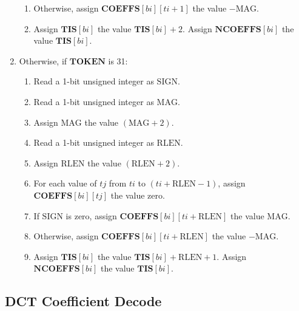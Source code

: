 \documentclass[9pt,letterpaper]{book}
\newcommand{\idx}[1]{{\ensuremath{\mathit{#1}}}}
\newcommand{\bi}{\idx{bi}}
\newcommand{\ti}{\idx{ti}}
\newcommand{\tj}{\idx{tj}}
\newcommand{\bitvar}[1]{\ensuremath{\mathbf{\bm{#1}}}}
\newcommand{\locvar}[1]{\ensuremath{\mathrm{#1}}}
\numberwithin{equation}{chapter}
\numberwithin{figure}{chapter}
\numberwithin{table}{chapter}
\begin{document}
\begin{enumerate}
\begin{enumerate}
\item
Otherwise, assign $\bitvar{COEFFS}[\bitvar{\bi}][\bitvar{\ti}+1]$ the value
 $-\locvar{MAG}$.
\item
Assign $\bitvar{TIS}[\bitvar{\bi}]$ the value $\bitvar{TIS}[\bitvar{\bi}]+2$.
Assign $\bitvar{NCOEFFS}[\bitvar{\bi}]$ the value $\bitvar{TIS}[\bitvar{\bi}]$.
\end{enumerate}
\item
Otherwise, if \bitvar{TOKEN} is 31:
\begin{enumerate}
\item
Read a 1-bit unsigned integer as \locvar{SIGN}.
\item
Read a 1-bit unsigned integer as \locvar{MAG}.
\item
Assign \locvar{MAG} the value $(\locvar{MAG}+2)$.
\item
Read a 1-bit unsigned integer as \locvar{RLEN}.
\item
Assign \locvar{RLEN} the value $(\locvar{RLEN}+2)$.
\item
For each value of \locvar{\tj} from \bitvar{\ti} to
 $(\bitvar{\ti}+\locvar{RLEN}-1)$, assign
 $\bitvar{COEFFS}[\bitvar{\bi}][\locvar{\tj}]$ the value zero.
\item
If \locvar{SIGN} is zero, assign
 $\bitvar{COEFFS}[\bitvar{\bi}][\bitvar{\ti}+\locvar{RLEN}]$ the value
 $\locvar{MAG}$.
\item
Otherwise, assign $\bitvar{COEFFS}[\bitvar{\bi}][\bitvar{\ti}+\locvar{RLEN}]$
 the value $-\locvar{MAG}$.
\item
Assign $\bitvar{TIS}[\bitvar{\bi}]$ the value
 $\bitvar{TIS}[\bitvar{\bi}]+\locvar{RLEN}+1$.
Assign $\bitvar{NCOEFFS}[\bitvar{\bi}]$ the value $\bitvar{TIS}[\bitvar{\bi}]$.
\end{enumerate}
\end{enumerate}

\subsection{DCT Coefficient Decode}
\label{sub:dct-coeffs}
\end{document}
